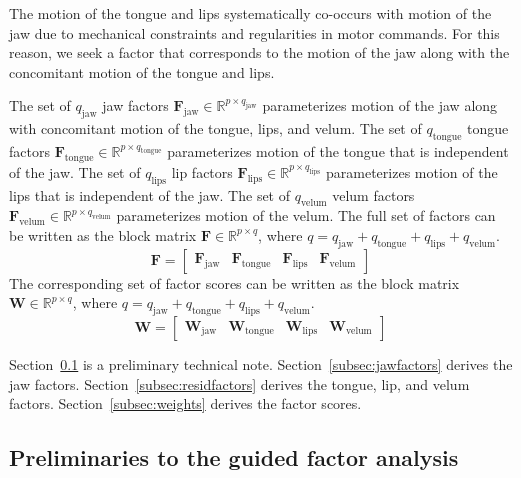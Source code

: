 \documentclass[preprint]{JASAnew}\usepackage[]{graphicx}\usepackage[]{color}
\begin{document}
The motion of the tongue and lips systematically co-occurs with motion of the jaw due to mechanical constraints and regularities in motor commands. For this reason, we seek a factor that corresponds to the motion of the jaw along with the concomitant motion of the tongue and lips.


The set of $q_\text{jaw}$ jaw factors $\mathbf{F}_\text{jaw} \in \mathbb{R}^{p\times q_\text{jaw}}$ parameterizes motion of the jaw along with concomitant motion of the tongue, lips, and velum.
%
The set of $q_\text{tongue}$ tongue factors $\mathbf{F}_\text{tongue} \in \mathbb{R}^{p\times q_\text{tongue}}$ parameterizes motion of the tongue that is independent of the jaw. 
%
The set of $q_\text{lips}$ lip factors $\mathbf{F}_\text{lips} \in \mathbb{R}^{p\times q_\text{lips}}$ parameterizes motion of the lips that is independent of the jaw.
%
The set of $q_\text{velum}$ velum factors $\mathbf{F}_\text{velum} \in \mathbb{R}^{p\times q_\text{velum}}$ parameterizes motion of the velum.
%
The full set of factors can be written as the block matrix $\mathbf{F} \in \mathbb{R}^{p\times q}$, where $q=q_\text{jaw}+q_\text{tongue}+q_\text{lips}+q_\text{velum}$. 
% 
\begin{equation}
\label{eq:Fblock}
\mathbf{F} = 
\left[
\begin{array}{c|c|c|c}
\mathbf{F}_\text{jaw} 
& \mathbf{F}_\text{tongue}
& \mathbf{F}_\text{lips}
& \mathbf{F}_\text{velum}
\end{array}
\right]
\end{equation}
%
The corresponding set of factor scores can be written as the block matrix $\mathbf{W} \in \mathbb{R}^{p\times q}$, where $q=q_\text{jaw}+q_\text{tongue}+q_\text{lips}+q_\text{velum}$. 
% 
\begin{equation}
\label{eq:Wblock}
\mathbf{W} = 
\left[
\begin{array}{c|c|c|c}
\mathbf{W}_\text{jaw} 
& \mathbf{W}_\text{tongue}
& \mathbf{W}_\text{lips}
& \mathbf{W}_\text{velum}
\end{array}
\right]
\end{equation}

Section~\ref{subsec:preliminaries} is a preliminary technical note. Section~\ref{subsec:jawfactors} derives the jaw factors. Section~\ref{subsec:residfactors} derives the tongue, lip, and velum factors. Section~\ref{subsec:weights} derives the factor scores. 





\subsection{Preliminaries to the guided factor analysis}
\label{subsec:preliminaries}
\end{document}
